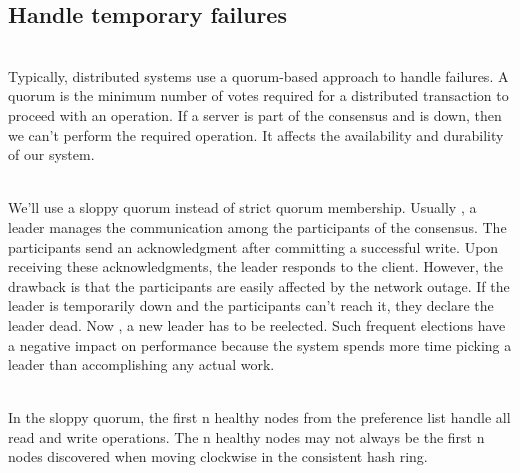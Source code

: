 

\subsection{Handle temporary failures}\label{K38mqSxm09MZ3qi74yn0v}
\\
Typically, distributed systems use a quorum-based approach to handle failures. A quorum is the minimum number of votes required for a distributed transaction to proceed with an operation. If a server is part of the consensus and is down, then we can't perform the required operation. It affects the availability and durability of our system.\\
\strut \\
We'll use a sloppy quorum instead of strict quorum membership. Usually , a leader manages the communication among the participants of the consensus. The participants send an acknowledgment after committing a successful write. Upon receiving these acknowledgments, the leader responds to the client. However, the drawback is that the participants are easily affected by the network outage. If the leader is temporarily down and the participants can't reach it, they declare the leader dead. Now
, a new leader has to be reelected. Such frequent elections have a negative impact on performance because the system spends more time picking a leader than accomplishing any actual work.\\
\strut \\
In the sloppy quorum, the first \protect{}\label{katex_inline_SN8BXXhIbE11uPam6aHTL}{{{\(\text{n}\)}}} healthy nodes from the preference list handle all read and write operations. The
\protect{}\label{katex_inline_e49pm5MAdBHXfWYCkZgFR}{{{\(\text{n}\)}}} healthy nodes may not always be the first \protect{}\label{katex_inline_1pIhHCmbqN2TWwCufoJl4}{{{\(\text{n}\)}}} nodes discovered when moving clockwise in the consistent hash ring.\\
\strut \\
